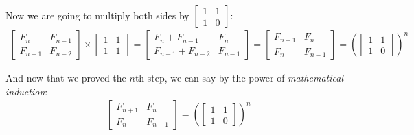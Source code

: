 \documentclass[12pt]{article}
\begin{document}
Now we are going to multiply both sides by \( \begin{bmatrix} 1 & 1 \\ 1 & 0 \end{bmatrix} \):
\begin{gather*}
    \begin{bmatrix}
        F_{n} & F_{n-1} \\
        F_{n-1} & F_{n-2}
    \end{bmatrix}
    \times
    \begin{bmatrix}
        1 & 1 \\
        1 & 1
    \end{bmatrix}
    =
    \begin{bmatrix}
        F_{n}+F_{n-1} & F_{n} \\
        F_{n-1}+F_{n-2} & F_{n-1}
    \end{bmatrix}
    =
    \begin{bmatrix}
        F_{n+1} & F_{n} \\
        F_{n} & F_{n-1}
    \end{bmatrix}
    =
    \left(\begin{bmatrix}
    1 & 1 \\
    1 & 0
    \end{bmatrix}\right)^{n}
\end{gather*}

And now that we proved the $n$th step, we can say by the power of \textit{mathematical induction}:
\begin{gather*}
    \begin{bmatrix}
        F_{n+1} & F_{n} \\
        F_{n} & F_{n-1}
    \end{bmatrix}
    =
    \left(\begin{bmatrix}
    1 & 1 \\
    1 & 0
    \end{bmatrix}\right)^{n}
\end{gather*}
\end{document}
